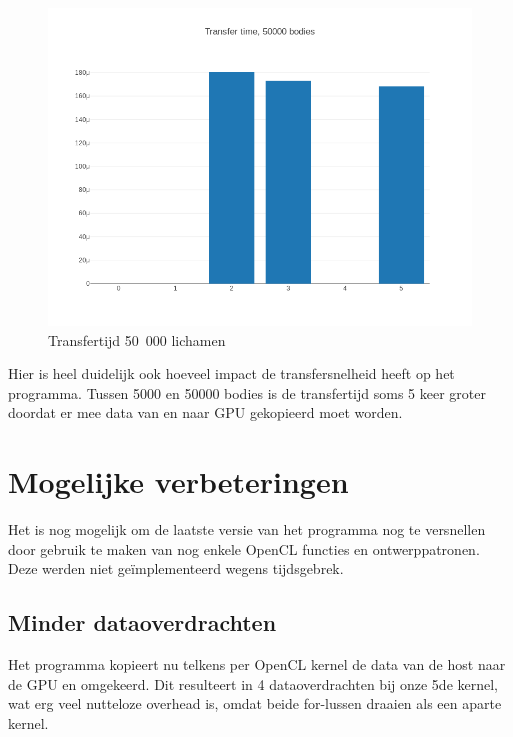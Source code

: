 \documentclass{article}
\begin{document}
\begin{figure}[H]
    \includegraphics[width=\linewidth]{./grafiekskes/hist_transfer50000.png}
    \caption{Transfertijd 50~000 lichamen}
\end{figure}

Hier is heel duidelijk ook hoeveel impact de transfersnelheid heeft op het programma.
Tussen 5000 en 50000 bodies is de transfertijd soms 5 keer groter doordat er mee data
van en naar GPU gekopieerd moet worden.

\section{Mogelijke verbeteringen}
\label{hfd:verbeteringen}
Het is nog mogelijk om de laatste versie van het programma nog te versnellen door
gebruik te maken van nog enkele OpenCL functies en ontwerppatronen. Deze werden
niet ge\"{i}mplementeerd wegens tijdsgebrek.

\subsection{Minder dataoverdrachten}
\label{hfd:dataoverdrachten}
Het programma kopieert nu telkens per OpenCL kernel de data van de host naar de GPU en
omgekeerd. Dit resulteert in 4 dataoverdrachten bij onze 5de kernel, wat erg veel nutteloze
overhead is, omdat beide for-lussen draaien als een aparte kernel.
\end{document}
